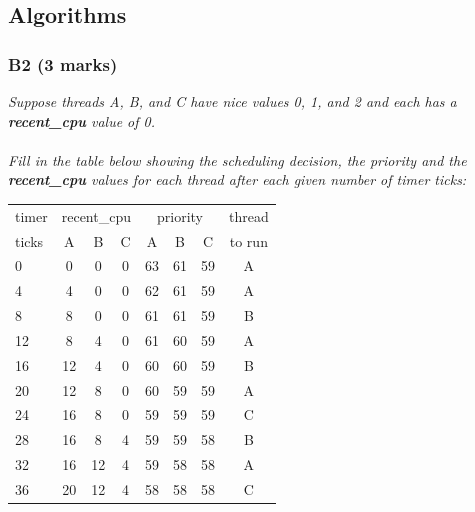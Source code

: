 \documentclass{report}
\newcommand{\question}[1]{\textit{#1} \\ }
\newcommand{\var}[1]{\textcolor{RoyalPurple}{\textbf{#1}}}
\begin{document}
        \subsection*{Algorithms}

            \subsubsection*{B2  (3 marks)}
                \question{Suppose threads A, B, and C have nice values 0, 1, and 2 and each has a \var{recent\_cpu} value of 0. 
                \\
                \\Fill in the table below showing the scheduling decision, the priority and the \var{recent\_cpu} values for each thread after each given number of timer ticks:}
            \begin{center}
                \begin{tabular}{l c c c c c c c}
                    timer & \multicolumn{3}{c}{recent\_cpu} & \multicolumn{3}{c}{priority} & thread \\
                    ticks & A & B & C & A & B & C & to run  \\
                    0 & 0 & 0 & 0 & 63 & 61 & 59 & A \\
                    4 & 4 & 0 & 0 & 62 & 61 & 59 & A \\
                    8 & 8 & 0 & 0 & 61 & 61 & 59 & B \\
                    12 & 8 & 4 & 0 & 61 & 60 & 59 & A \\
                    16 & 12 & 4 & 0 & 60 & 60 & 59 & B \\
                    20 & 12 & 8 & 0 & 60 & 59 & 59 & A \\
                    24 & 16 & 8 & 0 & 59 & 59 & 59 & C \\
                    28 & 16 & 8 & 4 & 59 & 59 & 58 & B \\
                    32 & 16 & 12 & 4 & 59 & 58 & 58 & A \\
                    36 & 20 & 12 & 4 & 58 & 58 & 58 & C \\
                \end{tabular}
            \end{center}
\end{document}
